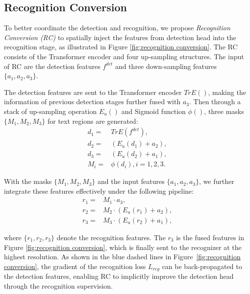 \documentclass[10pt,twocolumn,letterpaper]{article}
\begin{document}
\subsection{Recognition Conversion}
\label{sec:Recognition Conversion}

To better coordinate the detection and recognition, we propose \textit{Recognition Conversion (RC)} to spatially inject the features from detection head into the recognition stage, as illustrated in Figure \ref{fig:recognition conversion}. 
The RC consists of the Transformer encoder \cite{vaswani2017attention} and four up-sampling structures. The input of RC are the detection features $f^{det}$ and three down-sampling features $\{a_1,a_2,a_3\}$.


The detection features are sent to the Transformer encoder $TrE()$, making the information of previous detection stages further fused with $a_3$. 
Then through a stack of up-sampling operation $E_u()$ and Sigmoid function $\phi{()}$, three masks $\{M_1,M_2,M_3\}$ for text regions are generated:
\begin{eqnarray}
d_1 = & TrE(f^{det}), \\
d_2 = & (E_u(d_1) + a_2), \\
d_3 = & (E_u(d_2) + a_1), \\
M_i = & \phi{(d_i)}, i=1,2,3.
\end{eqnarray}


With the masks $\{M_1,M_2,M_3\}$ and the input features $\{a_1,a_2,a_3\}$, we further integrate these features effectively under the following pipeline:
\begin{eqnarray}
r_1 = & M_1 \cdot a_3, \\
r_2 = & M_2 \cdot (E_u(r_1)+a_2), \\
r_3 = & M_3 \cdot (E_u(r_2)+a_1),
\end{eqnarray}

where $\{r_1,r_2,r_3\}$ denote the recognition features. The $r_3$ is the fused features in Figure \ref{fig:recognition conversion}, which is finally sent to the recognizer at the highest resolution. 
As shown in the blue dashed lines in Figure~\ref{fig:recognition conversion},
the gradient of the recognition loss $L_{reg}$ can be back-propagated to the detection features, enabling RC to implicitly improve the detection head through the recognition supervision.
\end{document}
